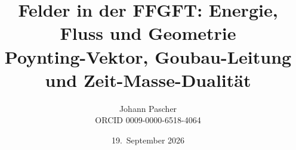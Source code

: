 \documentclass[11pt,a4paper]{report}
\title{Felder in der FFGFT: Energie, Fluss und Geometrie\\[0.5em]\large Poynting-Vektor, Goubau-Leitung und Zeit-Masse-Dualität}
\date{19.~September 2026}
\author{Johann Pascher\\\small ORCID 0009-0000-6518-4064}
\begin{document}
\renewcommand{\thechapter}{}
\renewcommand{\thesection}{\arabic{section}}
\maketitle
\tableofcontents

\end{document}
